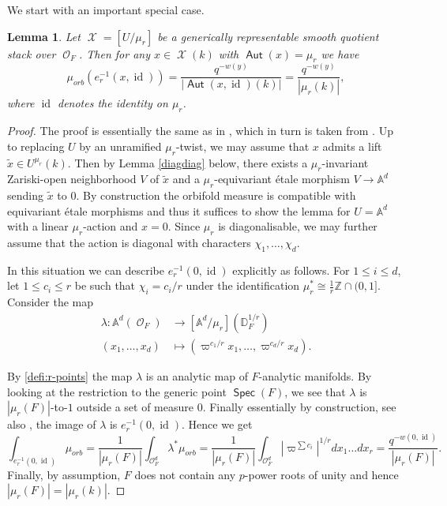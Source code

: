 \documentclass{article}
\DeclareMathOperator{\Xc}{\mathcal{X}}
\DeclareMathOperator{\Oc}{\mathcal{O}}
\DeclareMathOperator{\id}{id}
\DeclareMathOperator{\Aut}{\mathsf{Aut}}
\DeclareMathOperator{\Spec}{\mathsf{Spec}}
\newcommand{\BA}{{\mathbb{A}}}
\newcommand{\BZ}{{\mathbb{Z}}}
\newcommand{\Dr}[1][r]{\mathbb{D}_F^{1/#1}}
\theoremstyle{definition}
\theoremstyle{plain}
\newtheorem{lemma}[definition]{Lemma}
\begin{document}
We start with an important special case.
\begin{lemma}\label{locc} Let $\Xc = [U/\mu_r]$ be a generically representable smooth quotient stack over $\Oc_F$. Then for any $x\in \Xc(k)$ with $\Aut(x) = \mu_r$ we have
\[  \mu_{orb}( e_r^{-1}(x,\id))  = \frac{q^{-w(y)}}{|\Aut(x,\id)(k)|} = \frac{q^{-w(y)}}{|\mu_r(k)|} ,  \]
where $\id$ denotes the identity on $\mu_r$.
\end{lemma}
\begin{proof} The proof is essentially the same as in \cite[Lemma 2.22]{GWZ20b}, which in turn is taken from \cite{DL02}. Up to replacing $U$ by an unramified $\mu_r$-twist, we may assume that $x$ admits a lift $\tilde{x} \in U^{\mu_r}(k)$. Then by Lemma \ref{diagdiag} below, there exists a $\mu_r$-invariant Zariski-open neighborhood $V$ of $\tilde x$ and a $\mu_r$-equivariant étale morphism $V \to \BA^d$ sending $\tilde{x}$ to $0$. By construction the orbifold measure is compatible with equivariant étale morphisms and thus it suffices to show the lemma for $U=\BA^d$ with a linear $\mu_r$-action and $x=0$. Since $\mu_r$ is diagonalisable, we may further assume that the action is diagonal with characters $\chi_1,\dots,\chi_d$.

In this situation we can describe $ e_r^{-1}(0,\id)$ explicitly as follows. For $1 \leq i \leq d$, let $1\leq c_i \leq r$ be such that $\chi_i = c_i/r$ under the identification $\mu_r^* \cong \frac{1}{r} \BZ \cap (0,1]$. Consider the map
\begin{align*}
    \lambda: \BA^d(\Oc_F) &\rightarrow [\BA^d/\mu_r](\Dr)\\
    (x_1,\dots,x_d) &\mapsto (\varpi^{c_1/r}x_1,\dots,\varpi^{c_d/r}x_d).
\end{align*} 

By \ref{defi:r-points} the map $\lambda$ is an analytic map of $F$-analytic manifolds. By looking at the restriction to the generic point $\Spec(F)$, we see that $\lambda$ is $|\mu_r(F)|$-to-$1$ outside a set of measure $0$. Finally essentially by construction, see also \cite[(2.3.4)]{DL02}, the image of $\lambda$ is $e_r^{-1}(0,\id)$. Hence we get
\[ \int_{e_r^{-1}(0,\id)} \mu_{orb} = \frac{1}{|\mu_r(F)|}\int_{\Oc_F^d}\lambda^*\mu_{orb} =  \frac{1}{|\mu_r(F)|}\int_{\Oc_F^d} |\varpi^{\sum c_i}|^{1/r}dx_1\dots dx_r = \frac{q^{-w(0,\id)}}{|\mu_r(F)|}.  \]
Finally, by assumption, $F$ does not contain any $p$-power roots of unity and hence $|\mu_r(F) | =| \mu_r(k) |$.
\end{proof}
\end{document}
